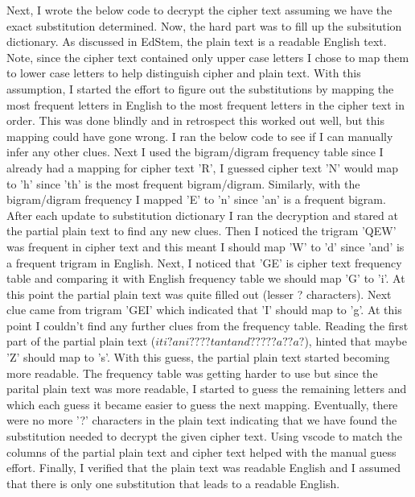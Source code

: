 \documentclass{article}
\begin{document}
    Next, I wrote the below code to decrypt the cipher text assuming we have the exact substitution determined. Now, the hard part was to fill up the subsitution dictionary. As discussed in EdStem, the plain text is a readable English text. Note, since the cipher text contained only upper case letters I chose to map them to lower case letters to help distinguish cipher and plain text. With this assumption, I started the effort to figure out the substitutions by mapping the most frequent letters in English to the most frequent letters in the cipher text in order. This was done blindly and in retrospect this worked out well, but this mapping could have gone wrong. I ran the below code to see if I can manually infer any other clues. Next I used the bigram/digram frequency table since I already had a mapping for cipher text 'R', I guessed cipher text 'N' would map to 'h' since 'th' is the most frequent bigram/digram. Similarly, with the bigram/digram frequency I mapped 'E' to 'n' since 'an' is a frequent bigram. After each update to substitution dictionary I ran the decryption and stared at the partial plain text to find any new clues. Then I noticed the trigram 'QEW' was frequent in cipher text and this meant I should map 'W' to 'd' since 'and' is a frequent trigram in English. Next, I noticed that 'GE' is cipher text frequency table and comparing it with English frequency table we should map 'G' to 'i'. At this point the partial plain text was quite filled out (lesser ? characters). Next clue came from trigram 'GEI' which indicated that 'I' should map to 'g'. At this point I couldn't find any further clues from the frequency table. Reading the first part of the partial plain text ($iti?ani????tantand?????a??a?$), hinted that maybe 'Z' should map to 's'. With this guess, the partial plain text started becoming more readable. The frequency table was getting harder to use but since the parital plain text was more readable, I started to guess the remaining letters and which each guess it became easier to guess the next mapping. Eventually, there were no more '?' characters in the plain text indicating that we have found the substitution needed to decrypt the given cipher text. Using vscode to match the columns of the partial plain text and cipher text helped with the manual guess effort. Finally, I verified that the plain text was readable English and I assumed that there is only one substitution that leads to a readable English.
\end{document}
